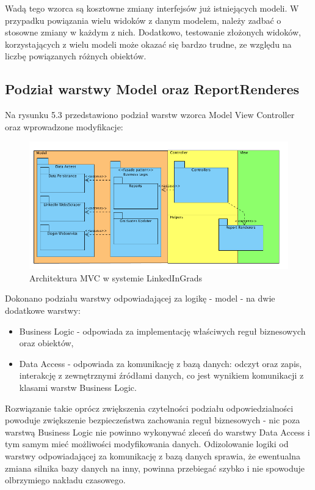 Wadą tego wzorca są kosztowne zmiany interfejsów już istniejących modeli. W przypadku powiązania wielu widoków z danym modelem, należy zadbać o stosowne zmiany w każdym z nich. Dodatkowo, testowanie złożonych widoków, korzystających z wielu modeli może okazać się bardzo trudne, ze względu na liczbę powiązanych różnych obiektów.

\subsection{Podział warstwy Model oraz ReportRenderes}

Na rysunku 5.3 przedstawiono podział warstw wzorca Model View Controller oraz wprowadzone modyfikacje:

\begin{figure}[H] 
\centering\includegraphics[width=15cm]{figures/image4}
\caption{Architektura MVC w systemie LinkedInGrads}\label{rys:use-case-diagram}
\end{figure}

Dokonano podziału warstwy odpowiadającej za logikę - model - na dwie dodatkowe warstwy:

\begin{itemize}
\item Business Logic - odpowiada za implementację właściwych reguł biznesowych oraz obiektów,
\item Data Access - odpowiada za komunikację z bazą danych: odczyt oraz zapis, interakcję z zewnętrznymi źródłami danych, co jest wynikiem komunikacji z klasami warstw Business Logic.
\end{itemize}

Rozwiązanie takie oprócz zwiększenia czytelności podziału odpowiedzialności powoduje zwiększenie bezpieczeństwa zachowania reguł biznesowych - nic poza warstwą Business Logic nie powinno wykonywać zleceń do warstwy Data Access i tym samym mieć możliwości modyfikowania danych. Odizolowanie logiki od warstwy odpowiadającej za komunikację z bazą danych sprawia, że ewentualna zmiana silnika bazy danych na inny, powinna przebiegać szybko i nie spowoduje olbrzymiego nakładu czasowego.

